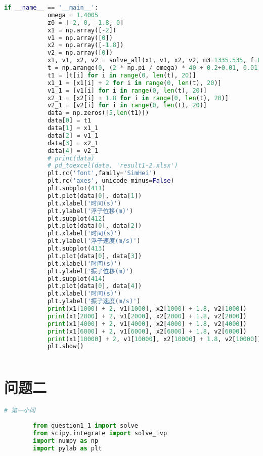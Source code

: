 \documentclass[withoutpreface,bwprint]{cumcmthesis} %
\begin{document}
\begin{appendices}
\begin{lstlisting}[language=python]
        if __name__ == '__main__':
            omega = 1.4005
            z0 = [-2, 0, -1.8, 0]
            x1 = np.array([-2])
            v1 = np.array([0])
            x2 = np.array([-1.8])
            v2 = np.array([0])
            x1, v1, x2, v2 = solve_all(x1, v1, x2, v2, m3=1335.535, f=6250, omega=1.4005, b0=10000, p=0.5, b1=656.3616)
            t = np.arange(0, (2 * np.pi / omega) * 40 + 0.2+0.01, 0.01)
            t1 = [t[i] for i in range(0, len(t), 20)]
            x1_1 = [x1[i] + 2 for i in range(0, len(t), 20)]
            v1_1 = [v1[i] for i in range(0, len(t), 20)]
            x2_1 = [x2[i] + 1.8 for i in range(0, len(t), 20)]
            v2_1 = [v2[i] for i in range(0, len(t), 20)]
            data = np.zeros([5,len(t1)])
            data[0] = t1
            data[1] = x1_1
            data[2] = v1_1
            data[3] = x2_1
            data[4] = v2_1
            # print(data)
            # pd_toexcel(data, 'result1-2.xlsx')
            plt.rc('font',family='SimHei')
            plt.rc('axes', unicode_minus=False)
            plt.subplot(411)
            plt.plot(data[0], data[1])
            plt.xlabel('时间(s)')
            plt.ylabel('浮子位移(m)')
            plt.subplot(412)
            plt.plot(data[0], data[2])
            plt.xlabel('时间(s)')
            plt.ylabel('浮子速度(m/s)')
            plt.subplot(413)
            plt.plot(data[0], data[3])
            plt.xlabel('时间(s)')
            plt.ylabel('振子位移(m)')
            plt.subplot(414)
            plt.plot(data[0], data[4])
            plt.xlabel('时间(s)')
            plt.ylabel('振子速度(m/s)')
            print(x1[1000] + 2, v1[1000], x2[1000] + 1.8, v2[1000])
            print(x1[2000] + 2, v1[2000], x2[2000] + 1.8, v2[2000])
            print(x1[4000] + 2, v1[4000], x2[4000] + 1.8, v2[4000])
            print(x1[6000] + 2, v1[6000], x2[6000] + 1.8, v2[6000])
            print(x1[10000] + 2, v1[10000], x2[10000] + 1.8, v2[10000])
            plt.show()
                     
        \end{lstlisting}

        \section{问题二}

        \begin{lstlisting}[language=python]
        # 第一小问
        
        from question1_1 import solve
        from scipy.integrate import solve_ivp
        import numpy as np
        import pylab as plt


\end{lstlisting}
\end{appendices}
\end{document}

